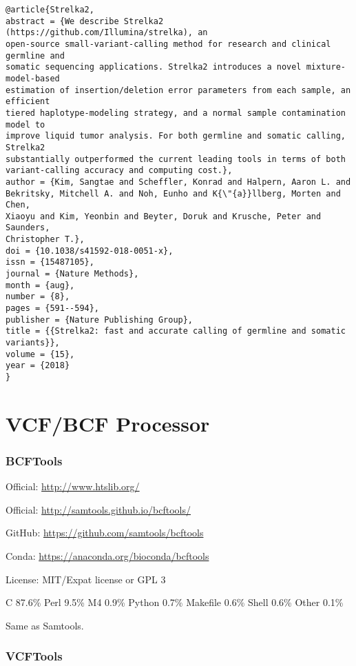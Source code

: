 \documentclass[]{article}
\begin{document}
\begin{verbatim}
@article{Strelka2,
abstract = {We describe Strelka2 (https://github.com/Illumina/strelka), an
open-source small-variant-calling method for research and clinical germline and
somatic sequencing applications. Strelka2 introduces a novel mixture-model-based
estimation of insertion/deletion error parameters from each sample, an efficient
tiered haplotype-modeling strategy, and a normal sample contamination model to
improve liquid tumor analysis. For both germline and somatic calling, Strelka2
substantially outperformed the current leading tools in terms of both
variant-calling accuracy and computing cost.},
author = {Kim, Sangtae and Scheffler, Konrad and Halpern, Aaron L. and
Bekritsky, Mitchell A. and Noh, Eunho and K{\"{a}}llberg, Morten and Chen,
Xiaoyu and Kim, Yeonbin and Beyter, Doruk and Krusche, Peter and Saunders,
Christopher T.},
doi = {10.1038/s41592-018-0051-x},
issn = {15487105},
journal = {Nature Methods},
month = {aug},
number = {8},
pages = {591--594},
publisher = {Nature Publishing Group},
title = {{Strelka2: fast and accurate calling of germline and somatic variants}},
volume = {15},
year = {2018}
}

\end{verbatim}



\part{VCF/BCF Processor}

\section{BCFTools}

Official: \url{http://www.htslib.org/}

Official: \url{http://samtools.github.io/bcftools/}

GitHub: \url{https://github.com/samtools/bcftools}

Conda: \url{https://anaconda.org/bioconda/bcftools}

License: MIT/Expat license or GPL 3

C 87.6\% Perl 9.5\% M4 0.9\% Python 0.7\% Makefile 0.6\% Shell 0.6\% Other 0.1\%

Same as Samtools.

\section{VCFTools}
\end{document}
